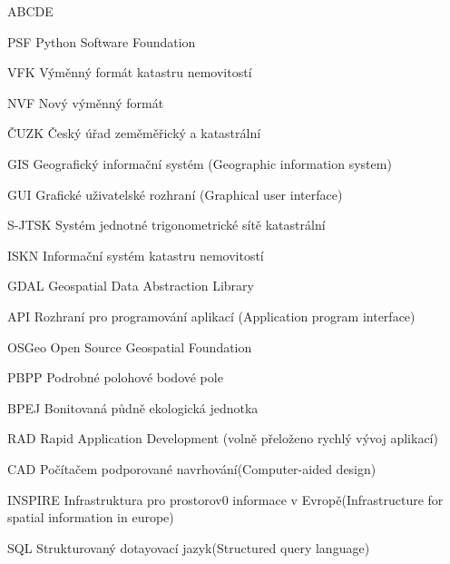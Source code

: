 
\begin{seznamzkratek}{ABCDE}

		  {PSF}
	      {Python Software Foundation}
	      
		  {VFK}
	      {Výměnný formát katastru nemovitostí}
	      
		  {NVF}
	      {Nový výměnný formát}
	      
	      {ČUZK}
	      {Český úřad zeměměřický a katastrální}

	      {GIS}
	      {Geografický informační systém (Geographic information system)}
	         
	      {GUI}
	      {Grafické uživatelské rozhraní (Graphical user interface)}
	           
	      {S-JTSK}
	      {Systém jednotné trigonometrické sítě katastrální}
	  
	      {ISKN}
	      {Informační systém katastru nemovitostí}        
	      
	      {GDAL}
	      {Geospatial Data Abstraction Library}
	      
	      {API}
	      {Rozhraní pro programování aplikací (Application program interface)}    
	      
	      {OSGeo}
	      {Open Source Geospatial Foundation}
	      
	      {PBPP}
	      {Podrobné polohové bodové pole}

	      {BPEJ}
	      {Bonitovaná půdně ekologická jednotka}
	      
	      {RAD}
	      {Rapid Application Development (volně přeloženo rychlý vývoj aplikací)}
	      
	      {CAD}
	      {Počítačem podporované navrhování(Computer-aided design)}
	      
	 	  {INSPIRE}
	 	  {Infrastruktura pro prostorov0 informace v Evropě(Infrastructure for spatial information in europe)}
	 	  
	 	  {SQL}
	 	  {Strukturovaný dotayovací jazyk(Structured query language)}
	        
\end{seznamzkratek}